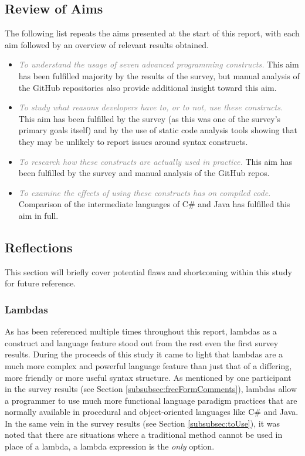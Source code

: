 \documentclass{article}
\begin{document}
    \subsection{Review of Aims}
        The following list repeats the aims presented at the start of this report, with each aim followed by an overview of relevant results obtained.
        \begin{itemize}
            \item \textcolor{gray}{\textit{To understand the usage of seven advanced programming constructs.}}
                This aim has been fulfilled majority by the results of the survey, but manual analysis of the GitHub repositories also provide additional insight toward this aim.
            \item \textcolor{gray}{\textit{To study what reasons developers have to, or to not, use these constructs.}}
                This aim has been fulfilled by the survey (as this was one of the survey's primary goals itself) and by the use of static code analysis tools showing that they may be unlikely to report issues around syntax constructs.
            \item \textcolor{gray}{\textit{To research how these constructs are actually used in practice.}}
                This aim has been fulfilled by the survey and manual analysis of the GitHub repos.
            \item \textcolor{gray}{\textit{To examine the effects of using these constructs has on compiled code.}}
                Comparison of the intermediate languages of C\# and Java has fulfilled this aim in full.
        \end{itemize}
    \subsection{Reflections}
        This section will briefly cover potential flaws and shortcoming within this study for future reference.

        \subsubsection{Lambdas}
        \label{subsubsec:lambdas}
            As has been referenced multiple times throughout this report, lambdas as a construct and language feature stood out from the rest even the first survey results. During the proceeds of this study it came to light that lambdas are a much more complex and powerful language feature than just that of a differing, more friendly or more useful syntax structure. As mentioned by one participant in the survey results (see Section \ref{subsubsec:freeFormComments}), lambdas allow a programmer to use much more functional language paradigm practices that are normally available in procedural and object-oriented languages like C\# and Java. In the same vein in the survey results (see Section \ref{subsubsec:toUse}), it was noted that there are situations where a traditional method cannot be used in place of a lambda, a lambda expression is the \emph{only} option.
            
\end{document}
